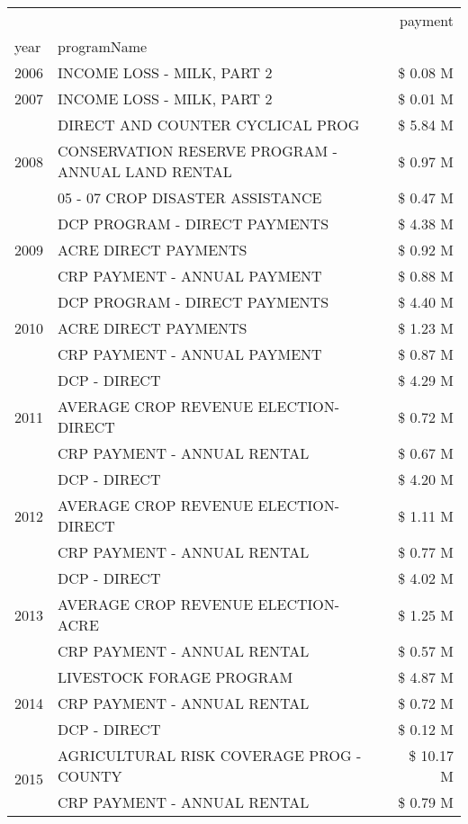 \begin{tabular}{llr}
\toprule
 &  & payment \\
year & programName &  \\
\midrule
2006 & INCOME LOSS - MILK, PART 2 & \$ 0.08 M \\
\cline{1-3}
2007 & INCOME LOSS - MILK, PART 2 & \$ 0.01 M \\
\cline{1-3}
\multirow[t]{3}{*}{2008} & DIRECT AND COUNTER CYCLICAL PROG & \$ 5.84 M \\
 & CONSERVATION RESERVE PROGRAM - ANNUAL LAND RENTAL & \$ 0.97 M \\
 & 05 - 07 CROP DISASTER ASSISTANCE & \$ 0.47 M \\
\cline{1-3}
\multirow[t]{3}{*}{2009} & DCP PROGRAM - DIRECT PAYMENTS & \$ 4.38 M \\
 & ACRE DIRECT PAYMENTS & \$ 0.92 M \\
 & CRP PAYMENT - ANNUAL PAYMENT & \$ 0.88 M \\
\cline{1-3}
\multirow[t]{3}{*}{2010} & DCP PROGRAM - DIRECT PAYMENTS & \$ 4.40 M \\
 & ACRE DIRECT PAYMENTS & \$ 1.23 M \\
 & CRP PAYMENT - ANNUAL PAYMENT & \$ 0.87 M \\
\cline{1-3}
\multirow[t]{3}{*}{2011} & DCP - DIRECT & \$ 4.29 M \\
 & AVERAGE CROP REVENUE ELECTION-DIRECT & \$ 0.72 M \\
 & CRP PAYMENT - ANNUAL RENTAL & \$ 0.67 M \\
\cline{1-3}
\multirow[t]{3}{*}{2012} & DCP - DIRECT & \$ 4.20 M \\
 & AVERAGE CROP REVENUE ELECTION-DIRECT & \$ 1.11 M \\
 & CRP PAYMENT - ANNUAL RENTAL & \$ 0.77 M \\
\cline{1-3}
\multirow[t]{3}{*}{2013} & DCP - DIRECT & \$ 4.02 M \\
 & AVERAGE CROP REVENUE ELECTION-ACRE & \$ 1.25 M \\
 & CRP PAYMENT - ANNUAL RENTAL & \$ 0.57 M \\
\cline{1-3}
\multirow[t]{3}{*}{2014} & LIVESTOCK FORAGE PROGRAM & \$ 4.87 M \\
 & CRP PAYMENT - ANNUAL RENTAL & \$ 0.72 M \\
 & DCP - DIRECT & \$ 0.12 M \\
\cline{1-3}
\multirow[t]{3}{*}{2015} & AGRICULTURAL RISK COVERAGE PROG - COUNTY & \$ 10.17 M \\
 & CRP PAYMENT - ANNUAL RENTAL & \$ 0.79 M \\

\end{tabular}
